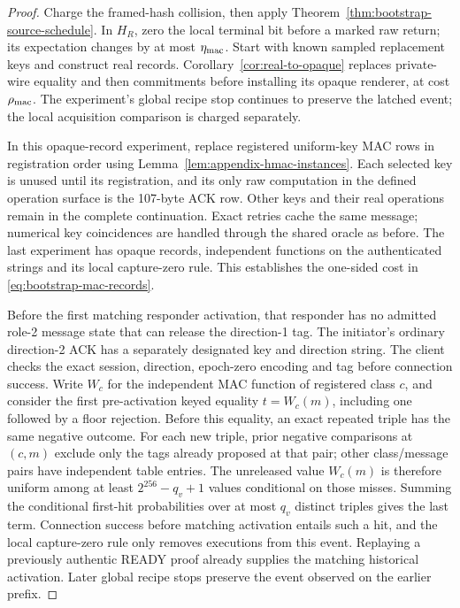 \documentclass[pdflatex]{sn-jnl}
\theoremstyle{thmstyleone}
\theoremstyle{thmstylethree}
\theoremstyle{thmstyletwo}
\begin{document}
\begin{proof}
Charge the framed-hash collision, then apply
Theorem~\ref{thm:bootstrap-source-schedule}. In $H_R$, zero the local
terminal bit before a marked raw return; its expectation changes by at
most $\eta_{\rm mac}$. Start with known sampled replacement keys and
construct real records. Corollary~\ref{cor:real-to-opaque} replaces
private-wire equality and then commitments before installing its opaque
renderer, at cost $\rho_{\rm mac}$. The experiment's global recipe
stop continues to preserve the latched event; the local acquisition
comparison is charged separately.

In this opaque-record experiment, replace registered uniform-key MAC rows
in registration order using Lemma~\ref{lem:appendix-hmac-instances}.
Each selected key is unused until its registration, and its only raw
computation in the defined operation surface is the 107-byte ACK row.
Other keys and their real operations remain in the complete continuation.
Exact retries cache the same message; numerical key coincidences are
handled through the shared oracle as before. The last experiment has opaque
records, independent functions on the authenticated strings and its local
capture-zero rule. This establishes the one-sided cost in
\eqref{eq:bootstrap-mac-records}.

Before the first matching responder activation, that responder has no
admitted role-2 message state that can release the direction-1 tag.
The initiator's ordinary direction-2 ACK has a separately designated key and
direction string. The client checks the exact session, direction, epoch-zero
encoding and tag before connection success. Write $W_c$ for the independent
MAC function of registered class $c$, and consider the first pre-activation
keyed equality $t=W_c(m)$, including one followed by a floor rejection.
Before this equality, an exact repeated triple has the same negative
outcome. For each new triple, prior negative comparisons at $(c,m)$ exclude
only the tags already proposed at that pair; other class/message pairs
have independent table entries. The unreleased value $W_c(m)$ is therefore
uniform among at least $2^{256}-q_v+1$ values conditional on those misses.
Summing the conditional first-hit probabilities over at most $q_v$
distinct triples gives the last term. Connection success before matching
activation entails such a hit, and the local capture-zero rule only removes
executions from this event. Replaying a previously authentic READY proof
already supplies the matching historical activation. Later global recipe
stops preserve the event observed on the earlier prefix.
\end{proof}
\end{document}
